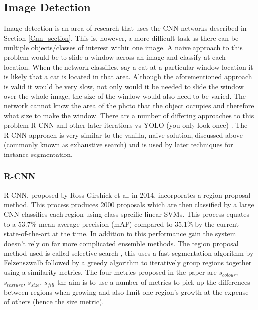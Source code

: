 \documentclass[a4paper,11pt,notitlepage]{article}
\begin{document}
\subsection{Image Detection} \label{Image_det}
Image detection is an area of research that uses the CNN networks described in Section \ref{Cnn_section}. This is, however, a more difficult task as there can be multiple objects/classes of interest within one image. A naive approach to this problem would be to slide a window across an image and classify at each location. When the network classifies, say a cat at a particular window location it is likely that a cat is located in that area.
\newline \newline
Although the aforementioned approach is valid it would be very slow, not only would it be needed to slide the window over the whole image, the size of the window would also need to be varied. The network cannot know the area of the photo that the object occupies and therefore what size to make the window. There are a number of differing approaches to this problem R-CNN \cite{DBLP:journals/corr/GirshickDDM13} and other later iterations vs YOLO (you only look once) \cite{DBLP:journals/corr/RedmonDGF15}. The R-CNN approach is very similar to the vanilla, naive solution, discussed above (commonly known as exhaustive search) and is used by later techniques for instance segmentation.


\subsubsection{R-CNN} \label{rcnn}
R-CNN, proposed by Ross Girshick et al. \cite{DBLP:journals/corr/GirshickDDM13} in 2014, incorporates a region proposal method. This process produces 2000 proposals which are then classified by a large CNN classifies each region using class-specific linear SVMs. This process equates to a 53.7\% mean average precision (mAP) compared to 35.1\% by the current state-of-the-art at the time. In addition to this performance gain the system doesn't rely on far more complicated ensemble methods.
\newline \newline
The region proposal method used is called selective search \cite{Uijlings2013} , this uses a fast segmentation algorithm by Felzenszwalb \cite{Felzenszwalb2004} followed by a greedy algorithm to iteratively group regions together using a similarity metrics. The four metrics proposed in the paper are $s_{colour}$, $s_{texture}$, $s_{size}$, $s_{fill}$  the aim is to use a number of metrics to pick up the differences between regions when growing and also limit one region's growth at the expense of others (hence the size metric).
\end{document}
